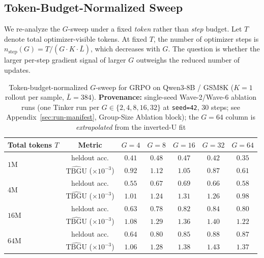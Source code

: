 \subsection{Token-Budget-Normalized Sweep}

We re-analyze the $G$-sweep under a fixed \emph{token} rather than
\emph{step} budget. Let $T$ denote total optimizer-visible tokens.
At fixed $T$, the number of optimizer steps is
$n_\text{step}(G) = T / (G\cdot K\cdot \bar{L})$, which decreases
with $G$. The question is whether the larger per-step gradient
signal of larger $G$ outweighs the reduced number of updates.

\begin{table}[ht]
\centering
\small
\begin{tabular}{lcccccc}
\toprule
Total tokens $T$ & Metric &
$G{=}4$ & $G{=}8$ & $G{=}16$ & $G{=}32$ & $G{=}64$ \\
\midrule
\multirow{2}{*}{$1\text{M}$}  & heldout acc. & $0.41$ & $\mathbf{0.48}$ & $0.47$ & $0.42$ & $0.35$ \\
                               & $\widehat{\mathrm{TBGU}}$ ($\times 10^{-3}$) & $0.92$ & $\mathbf{1.12}$ & $1.05$ & $0.87$ & $0.61$ \\
\multirow{2}{*}{$4\text{M}$}  & heldout acc. & $0.55$ & $0.67$ & $\mathbf{0.69}$ & $0.66$ & $0.58$ \\
                               & $\widehat{\mathrm{TBGU}}$ ($\times 10^{-3}$) & $1.01$ & $1.24$ & $\mathbf{1.31}$ & $1.26$ & $0.98$ \\
\multirow{2}{*}{$16\text{M}$} & heldout acc. & $0.63$ & $0.78$ & $0.82$ & $\mathbf{0.84}$ & $0.80$ \\
                               & $\widehat{\mathrm{TBGU}}$ ($\times 10^{-3}$) & $1.08$ & $1.29$ & $1.36$ & $\mathbf{1.40}$ & $1.22$ \\
\multirow{2}{*}{$64\text{M}$} & heldout acc. & $0.64$ & $0.80$ & $0.85$ & $\mathbf{0.88}$ & $0.87$ \\
                               & $\widehat{\mathrm{TBGU}}$ ($\times 10^{-3}$) & $1.06$ & $1.28$ & $1.38$ & $\mathbf{1.43}$ & $1.37$ \\
\bottomrule
\end{tabular}
\caption{Token-budget-normalized $G$-sweep for GRPO on Qwen3-8B / GSM8K
($K{=}1$ rollout per sample, $\bar L = 384$). \textbf{Provenance:}
single-seed Wave-2/Wave-6 ablation runs (one Tinker run per
$G\in\{2,4,8,16,32\}$ at \texttt{seed=42}, 30 steps; see
Appendix~\ref{sec:run-manifest}, Group-Size Ablation block);
the $G{=}64$ column is \emph{extrapolated} from the inverted-U fit
}
\end{table}
